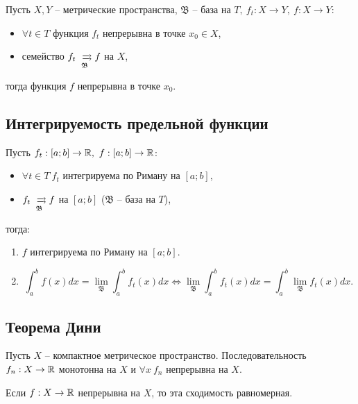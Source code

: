 \begin{theorem}
    Пусть $ X,Y $ -- метрические пространства, $ \mathfrak{B} $ -- база на $ T, \ f_t: X \rightarrow Y, \ f: X \rightarrow Y $:
    \begin{itemize}
        \item $ \forall t \in T $ функция $ f_t $ непрерывна в точке $ x_0 \in X $,
        \item семейство $ f_t \xrightrightarrows[\mathfrak{B}]{} f $ на $ X $,
    \end{itemize}
    тогда функция $ f $ непрерывна в точке $ x_0 $.
\end{theorem}

\subsection{Интегрируемость предельной функции}

\begin{theorem}\label{theorem:6.9.2}
    Пусть $ f_t: [a;b] \rightarrow \mathbb{R}, \ f: [a;b] \rightarrow \mathbb{R} $:
    \begin{itemize}
        \item $ \forall t \in T \ f_t $ интегрируема по Риману на $ [a;b] $,
        \item $ f_t \xrightrightarrows[\mathfrak{B}]{} f $ на $ [a;b] $ ($ \mathfrak{B} $ -- база на $ T $),
    \end{itemize}
    тогда:
    \begin{enumerate}
        \item $ f $ интегрируема по Риману на $ [a;b] $.
        \item \[
                  \int_{a}^{b}f(x)dx = \underset{\mathfrak{B}}{\lim}\int_{a}^{b}f_t(x)dx \iff \underset{\mathfrak{B}}{\lim}\int_{a}^{b}f_t(x)dx = \int_{a}^{b}\underset{\mathfrak{B}}{\lim}f_t(x)dx.
              \]
    \end{enumerate}
\end{theorem}

\subsection{Теорема Дини}

\begin{theorem}[Дини]
    Пусть $ X $ -- компактное метрическое пространство. Последовательность $ f_n: X \rightarrow\mathbb{R} $ монотонна на $ X $ и $ \forall x \ f_n $ непрерывна на $ X $.

    Если $ f: X \rightarrow \mathbb{R} $ непрерывна на $ X $, то эта сходимость равномерная.
\end{theorem}

